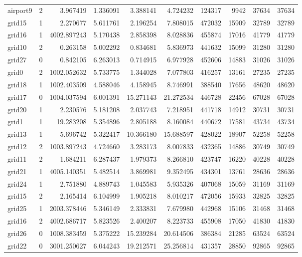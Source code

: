 \begin{longtable}{|l|r|r|r|r|r|r|r|r|r|}
airport9 & 2 & 3.967419 & 1.336091 & 3.388141 & 4.724232 & 124317 & 9942 & 37634 & 37634 \\
grid15 & 1 & 2.270677 & 5.611761 & 2.196254 & 7.808015 & 472032 & 15909 & 32789 & 32789 \\
grid16 & 1 & 4002.897243 & 5.170438 & 2.858398 & 8.028836 & 455874 & 17016 & 41779 & 41779 \\
grid10 & 2 & 0.263158 & 5.002292 & 0.834681 & 5.836973 & 441632 & 15099 & 31280 & 31280 \\
grid27 & 0 & 0.842105 & 6.263013 & 0.714915 & 6.977928 & 452606 & 14883 & 31026 & 31026 \\
grid0 & 2 & 1002.052632 & 5.733775 & 1.344028 & 7.077803 & 416257 & 13161 & 27235 & 27235 \\
grid18 & 1 & 1002.403509 & 4.588046 & 4.158945 & 8.746991 & 388540 & 17656 & 48620 & 48620 \\
grid17 & 0 & 1004.037594 & 6.001391 & 15.271143 & 21.272534 & 446728 & 22456 & 67028 & 67028 \\
grid20 & 1 & 2.230576 & 5.181208 & 2.037743 & 7.218951 & 441718 & 14912 & 30731 & 30731 \\
grid1 & 1 & 19.283208 & 5.354896 & 2.805188 & 8.160084 & 440672 & 17581 & 43734 & 43734 \\
grid13 & 1 & 5.696742 & 5.322417 & 10.366180 & 15.688597 & 428022 & 18907 & 52258 & 52258 \\
grid12 & 2 & 1003.897243 & 4.724660 & 3.283173 & 8.007833 & 432365 & 14886 & 30749 & 30749 \\
grid11 & 2 & 1.684211 & 6.287437 & 1.979373 & 8.266810 & 423747 & 16220 & 40228 & 40228 \\
grid21 & 1 & 4005.140351 & 5.482514 & 3.869981 & 9.352495 & 434301 & 13761 & 28636 & 28636 \\
grid24 & 1 & 2.751880 & 4.889743 & 1.045583 & 5.935326 & 407068 & 15059 & 31169 & 31169 \\
grid15 & 2 & 2.165414 & 6.104999 & 1.905218 & 8.010217 & 472056 & 15933 & 32825 & 32825 \\
grid25 & 1 & 2003.378446 & 5.346149 & 2.333831 & 7.679980 & 442968 & 15106 & 31468 & 31468 \\
grid16 & 2 & 4002.686717 & 5.823526 & 2.400207 & 8.223733 & 455908 & 17050 & 41830 & 41830 \\
grid26 & 0 & 1008.383459 & 5.375222 & 15.239284 & 20.614506 & 386384 & 21285 & 63524 & 63524 \\
grid22 & 0 & 3001.250627 & 6.044243 & 19.212571 & 25.256814 & 431357 & 28850 & 92865 & 92865 \\

\end{longtable}
